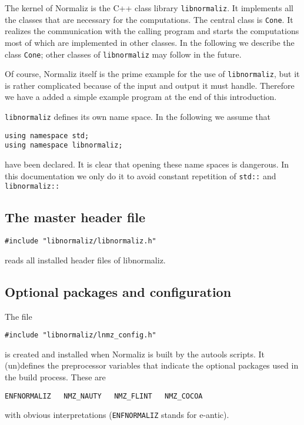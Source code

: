 \documentclass[12pt,a4paper]{scrartcl}
\theoremstyle{definition}
\begin{document}
\begin{small}
	
The kernel of Normaliz is the C++ class library \verb|libnormaliz|. It implements all the classes that are necessary for the computations. The central class is \verb|Cone|. It realizes the communication with the calling program and starts the computations most of which are implemented in other classes. In the following we describe the class \verb|Cone|; other classes of \verb|libnormaliz| may follow in the future.

Of course, Normaliz itself is the prime example for the use of \verb|libnormaliz|, but it is rather complicated because of the input and output it must handle. Therefore we have a added a simple example program at the end of this introduction.

\verb|libnormaliz| defines its own name space. In the following we assume that
\begin{Verbatim}
using namespace std;
using namespace libnormaliz;
\end{Verbatim}
have been declared. It is clear that opening these name spaces is dangerous. In this documentation we only do it to avoid constant repetition of \verb|std::| and \verb|libnormaliz::|

\subsection{The master header file}

\begin{Verbatim}
#include "libnormaliz/libnormaliz.h"
\end{Verbatim}
reads all installed header files of libnormaliz.

\subsection{Optional packages and configuration}

The file 
\begin{Verbatim}
#include "libnormaliz/lnmz_config.h"
\end{Verbatim}
is created and installed when Normaliz is built by the autools scripts. It  (un)defines the preprocessor variables that indicate the optional packages used in the build process. These are
\begin{Verbatim}
ENFNORMALIZ   NMZ_NAUTY   NMZ_FLINT   NMZ_COCOA 
\end{Verbatim}
with obvious interpretations (\verb|ENFNORMALIZ| stands for e-antic).


\end{small}
\end{document}
